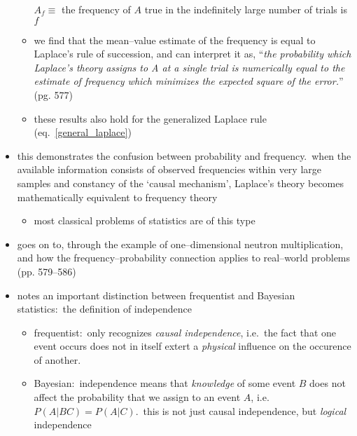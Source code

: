 \documentclass[../jaynes_prob_theory_notes.tex]{subfiles}
\begin{document}
\begin{itemize}
\begin{itemize}
\begin{displayquote}
                                \(A_f \equiv\) the frequency of \(A\) true in the indefinitely large number of trials is \(f\)
                            \end{displayquote}
                        \item we find that the mean--value estimate of the frequency is equal to Laplace's rule of succession, and can interpret it as, ``\textit{the probability which Laplace's theory assigns to A at a single trial is numerically equal to the estimate of frequency which minimizes the expected square of the error.}'' (pg. 577)
                        \item these results also hold for the generalized Laplace rule (eq.~\ref{general_laplace})
                    \end{itemize}
                \item this demonstrates the confusion between probability and frequency.\ when the available information consists of observed frequencies within very large samples and constancy of the `causal mechanism', Laplace's theory becomes mathematically equivalent to frequency theory
                    \begin{itemize} 
                        \item most classical problems of statistics are of this type
                    \end{itemize}
                \item goes on to, through the example of one--dimensional neutron multiplication, and how the frequency--probability connection applies to real--world problems (pp. 579--586)
                \item notes an important distinction between frequentist and Bayesian statistics:\ the definition of independence
                    \begin{itemize} 
                        \item frequentist:\ only recognizes \textit{causal independence}, i.e.\ the fact that one event occurs does not in itself extert a \textit{physical} influence on the occurence of another.
                        \item Bayesian:\ independence means that \textit{knowledge} of some event \(B\) does not affect the probability that we assign to an event \(A\), i.e.\ \(P(A|BC) = P(A|C)\).\ this is not just causal independence, but \textit{logical} independence
                    \end{itemize}
            \end{itemize}
\end{document}
